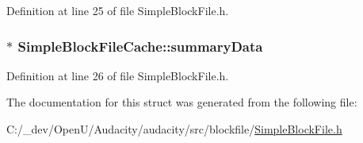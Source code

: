 Definition at line 25 of file Simple\+Block\+File.\+h.

\subsubsection[{\texorpdfstring{summary\+Data}{summaryData}}]{$\ast$ Simple\+Block\+File\+Cache\+::summary\+Data}\hypertarget{struct_simple_block_file_cache_a4e097d86a1b1b1bada818e5fc6ae7d60}{}\label{struct_simple_block_file_cache_a4e097d86a1b1b1bada818e5fc6ae7d60}


Definition at line 26 of file Simple\+Block\+File.\+h.



The documentation for this struct was generated from the following file\+:\begin{DoxyCompactItemize}
\item 
C\+:/\+\_\+dev/\+Open\+U/\+Audacity/audacity/src/blockfile/\hyperlink{_simple_block_file_8h}{Simple\+Block\+File.\+h}\end{DoxyCompactItemize}
